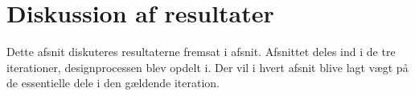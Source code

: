 
\chapter{Diskussion af resultater}
Dette afsnit diskuteres resultaterne fremsat i afsnit. Afsnittet deles ind i de tre iterationer, designprocessen blev opdelt i. Der vil i hvert afsnit blive lagt vægt på de essentielle dele i den gældende iteration.





